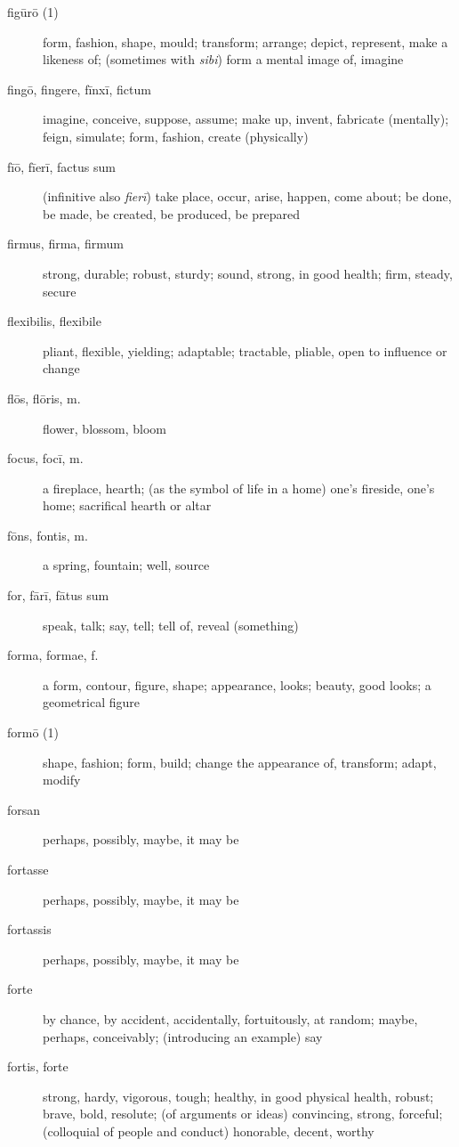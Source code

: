 \begin{description}
    \item[figūrō (1)] form, fashion, shape, mould; transform; arrange; depict, represent, make a likeness of; (sometimes with \textit{sibi}) form a mental image of, imagine
    \item[fingō, fingere, fīnxī, fictum] \marginnote{*}imagine, conceive, suppose, assume; make up, invent, fabricate (mentally); feign, simulate; form, fashion, create (physically)
    \item[fīō, fīerī, factus sum] \marginnote{*}(infinitive also \textit{fierī}) take place, occur, arise, happen, come about; be done, be made, be created, be produced, be prepared
    \item[firmus, firma, firmum] strong, durable; robust, sturdy; sound, strong, in good health; firm, steady, secure
    \item[flexibilis, flexibile] pliant, flexible, yielding; adaptable; tractable, pliable, open to influence or change
    \item[flōs, flōris, m.] \marginnote{*}flower, blossom, bloom
    \item[focus, focī, m.] a fireplace, hearth; (as the symbol of life in a home) one's fireside, one's home; sacrifical hearth or altar
    \item[fōns, fontis, m.] \marginnote{*}a spring, fountain; well, source
    \item[for, fārī, fātus sum] \marginnote{*}speak, talk; say, tell; tell of, reveal (something)
    \item[forma, formae, f.] \marginnote{*}a form, contour, figure, shape; appearance, looks; beauty, good looks; a geometrical figure
    \item[formō (1)] shape, fashion; form, build; change the appearance of, transform; adapt, modify
    \item[forsan] \marginnote{*}perhaps, possibly, maybe, it may be
    \item[fortasse] \marginnote{*}perhaps, possibly, maybe, it may be
    \item[fortassis] perhaps, possibly, maybe, it may be
    \item[forte] by chance, by accident, accidentally, fortuitously, at random; maybe, perhaps, conceivably; (introducing an example) say
    \item[fortis, forte] \marginnote{*}strong, hardy, vigorous, tough; healthy, in good physical health, robust; brave, bold, resolute; (of arguments or ideas) convincing, strong, forceful; (colloquial of people and conduct) honorable, decent, worthy

\end{description}
